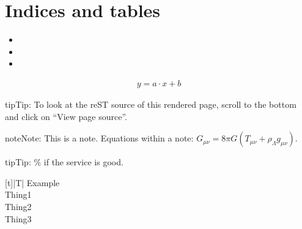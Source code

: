 \documentclass[letterpaper,10pt,english]{sphinxmanual}
\begin{document}
\chapter{Indices and tables}
\label{\detokenize{index:indices-and-tables}}\begin{itemize}
\item {} 
\sphinxAtStartPar
{}

\item {} 
\sphinxAtStartPar
{}

\item {} 
\sphinxAtStartPar
{}

\end{itemize}
\begin{equation*}
\begin{split}y = a \cdot x + b\end{split}
\end{equation*}
\begin{sphinxadmonition}{tip}{Tip:}
\sphinxAtStartPar
To look at the reST source of this rendered page, scroll to the bottom
and click on “View page source”.
\end{sphinxadmonition}

\begin{sphinxadmonition}{note}{Note:}
\sphinxAtStartPar
This is a note.
Equations within a note:
\(G_{\mu\nu} = 8 \pi G (T_{\mu\nu}  + \rho_\Lambda g_{\mu\nu})\).
\end{sphinxadmonition}

\begin{sphinxadmonition}{tip}{Tip:}
\% if the service is good.


\begin{savenotes}\sphinxattablestart
\centering
\begin{tabulary}{\linewidth}[t]{|T|}
\hline
\sphinxstyletheadfamily 
\sphinxAtStartPar
Example
\\
\hline
\sphinxAtStartPar
Thing1
\\
\hline
\sphinxAtStartPar
Thing2
\\
\hline
\sphinxAtStartPar
Thing3
\\
\hline
\end{tabulary}
\par
\sphinxattableend\end{savenotes}
\end{sphinxadmonition}



\renewcommand{\indexname}{Index}
\printindex
\end{document}
